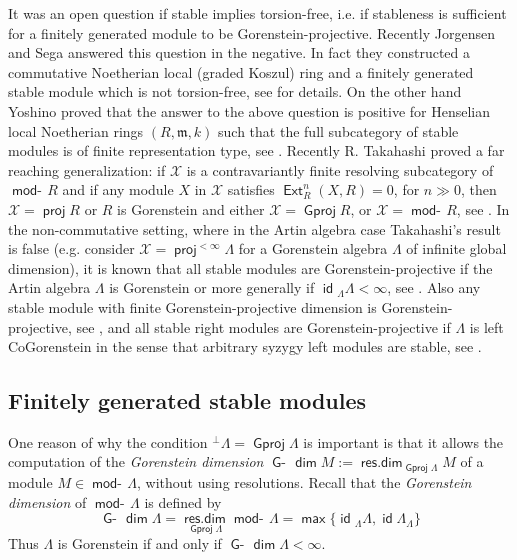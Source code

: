 \documentclass[oneside, a4paper,reqno]{amsart}
\numberwithin{equation}{section}
\theoremstyle{definition}
\begin{document}
It was an open question if stable implies torsion-free, i.e. if
stableness is sufficient for a finitely generated module  to be
Gorenstein-projective. Recently Jorgensen and Sega answered this
question in the negative. In fact they constructed a commutative
Noetherian local (graded Koszul) ring and a finitely generated
stable module which is not torsion-free, see \cite{JS} for details.
On the other hand Yoshino proved that the answer to the above
question is positive for Henselian local Noetherian  rings
$(R,\mathfrak{m},k)$ such that the full subcategory of stable
modules is of finite representation type, see \cite{Yoshino}.
Recently R. Takahashi proved a far reaching generalization: if ${\mathcal X}$
is a contravariantly finite resolving subcategory of $\operatorname*{\mathsf{mod}-\!} R$ and
if any module $X$ in ${\mathcal X}$ satisfies $\operatorname*{\mathsf{Ext}}^{n}_{R}(X,R) = 0$, for $n
\gg 0$, then ${\mathcal X} = \operatorname*{\mathsf{proj}} R$ or $R$ is Gorenstein and either ${\mathcal X} =
{\operatorname{\mathsf{Gproj}}\nolimits} R$, or ${\mathcal X} = \operatorname*{\mathsf{mod}-\!} R$, see \cite{Takahashi}. In the
non-commutative setting, where in the Artin algebra case Takahashi's
result is  false (e.g. consider ${\mathcal X} = \operatorname*{\mathsf{proj}}^{<\infty}\Lambda$ for a
Gorenstein algebra $\Lambda$ of infinite global dimension), it is
known that all stable modules are Gorenstein-projective if the Artin
algebra $\Lambda$ is Gorenstein or more generally if
$\operatorname*{\mathsf{id}}{_{\Lambda}}\Lambda < \infty$, see \cite[Proposition 4.4]{B:cm}.
Also any stable module with finite Gorenstein-projective dimension
is Gorenstein-projective, see \cite[Proposition 3.9]{B:cm}, and all
stable right modules are Gorenstein-projective if $\Lambda$ is left
CoGorenstein in the sense that arbitrary syzygy left modules are
stable, see \cite[Proposition 4.4]{B:cm}.

\subsection{Finitely generated stable modules} One reason of why the condition ${^{\bot}}\Lambda =
{\operatorname{\mathsf{Gproj}}\nolimits}\Lambda$ is important is that it  allows the computation of
the {\em Gorenstein dimension} $\operatorname*{\mathsf{G}-\!}\operatorname*{\mathsf{dim}} M := \operatorname*{\mathsf{res.dim}}_{{\operatorname{\mathsf{Gproj}}\nolimits}\Lambda}M$
of a module $M \in \operatorname*{\mathsf{mod}-\!}\Lambda$, without using resolutions. Recall
that the {\em Gorenstein dimension} of $\operatorname*{\mathsf{mod}-\!}\Lambda$ is defined by
\[
\operatorname*{\mathsf{G}-\!}\operatorname*{\mathsf{dim}}\Lambda = \operatorname*{\mathsf{res.dim}}_{{\operatorname{\mathsf{Gproj}}\nolimits}\Lambda}\operatorname*{\mathsf{mod}-\!}\Lambda =
\operatorname*{\mathsf{max}}\big\{\operatorname*{\mathsf{id}}{_{\Lambda}}\Lambda,\operatorname*{\mathsf{id}}\Lambda_{\Lambda}\big\}
\]
Thus $\Lambda$ is Gorenstein if and only if $\operatorname*{\mathsf{G}-\!}\operatorname*{\mathsf{dim}}\Lambda <
\infty$.
\end{document}
